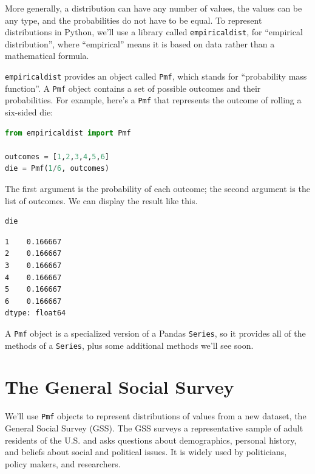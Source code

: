 More generally, a distribution can have any number of values, the values
can be any type, and the probabilities do not have to be equal. To
represent distributions in Python, we'll use a library called
\passthrough{\lstinline!empiricaldist!}, for ``empirical distribution'',
where ``empirical'' means it is based on data rather than a mathematical
formula.

\passthrough{\lstinline!empiricaldist!} provides an object called
\passthrough{\lstinline!Pmf!}, which stands for ``probability mass
function''. A \passthrough{\lstinline!Pmf!} object contains a set of
possible outcomes and their probabilities. For example, here's a
\passthrough{\lstinline!Pmf!} that represents the outcome of rolling a
six-sided die:

\begin{lstlisting}[language=Python,style=source]
from empiricaldist import Pmf

outcomes = [1,2,3,4,5,6]
die = Pmf(1/6, outcomes)
\end{lstlisting}

The first argument is the probability of each outcome; the second
argument is the list of outcomes. We can display the result like this.

\begin{lstlisting}[language=Python,style=source]
die
\end{lstlisting}

\begin{lstlisting}[style=output]
1    0.166667
2    0.166667
3    0.166667
4    0.166667
5    0.166667
6    0.166667
dtype: float64
\end{lstlisting}

A \passthrough{\lstinline!Pmf!} object is a specialized version of a
Pandas \passthrough{\lstinline!Series!}, so it provides all of the
methods of a \passthrough{\lstinline!Series!}, plus some additional
methods we'll see soon.

\hypertarget{the-general-social-survey}{%
\section{The General Social Survey}\label{the-general-social-survey}}

We'll use \passthrough{\lstinline!Pmf!} objects to represent
distributions of values from a new dataset, the General Social Survey
(GSS). The GSS surveys a representative sample of adult residents of the
U.S. and asks questions about demographics, personal history, and
beliefs about social and political issues. It is widely used by
politicians, policy makers, and researchers.

